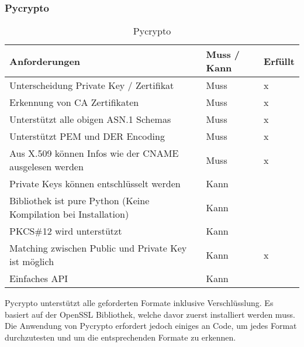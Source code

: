\subsubsection{Pycrypto}
\begin{table}[H]
\centering
    \begin{tabular}{|p{12cm}|l|l|}
    \hline
    \rowcolor{lightblue}
    Anforderungen & Muss / Kann & Erfüllt   \\ \hline
	Unterscheidung Private Key / Zertifikat	&	Muss & x \\ \hline	
	Erkennung von CA Zertifikaten	&	Muss	& x \\ \hline	
	Unterstützt alle obigen ASN.1 Schemas	&	Muss	& x \\ \hline		
	Unterstützt PEM und DER Encoding	&	Muss	&  x \\ \hline	
	Aus X.509 können Infos wie der CNAME ausgelesen werden &	Muss	& x \\ \hline	
	Private Keys können entschlüsselt werden &	Kann &  \\ \hline
	Bibliothek ist pure Python (Keine Kompilation bei Installation) &	Kann	&   \\ \hline
	PKCS\#12 wird unterstützt &	Kann &  \\ \hline
	Matching zwischen Public und Private Key ist möglich &	Kann &  x \\ \hline
	Einfaches API &	Kann &  \\ \hline
	\end{tabular}
    \caption[Pycrypto]{Pycrypto}
\end{table}
\medskip
Pycrypto unterstützt alle geforderten Formate inklusive Verschlüsslung. Es basiert auf der OpenSSL Bibliothek, welche davor zuerst installiert werden muss. Die Anwendung von Pycrypto erfordert jedoch einiges an Code, um jedes Format durchzutesten und um die entsprechenden Formate zu erkennen.\\


